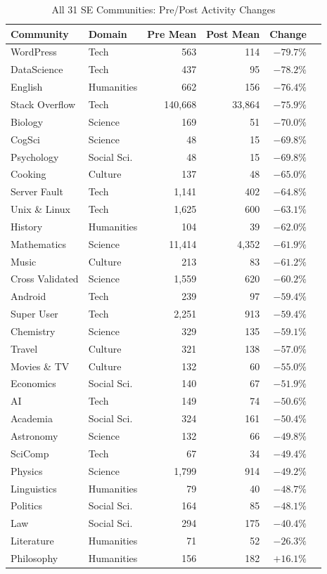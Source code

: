 \documentclass[11pt,a4paper]{article}
\begin{document}
\begin{table}[H]
\centering
\caption{All 31 SE Communities: Pre/Post Activity Changes}
\begin{tabular}{llrrrc}
\toprule
\textbf{Community} & \textbf{Domain} & \textbf{Pre Mean} & \textbf{Post Mean} & \textbf{Change} \\
\midrule
WordPress & Tech & 563 & 114 & $-79.7\%$ \\
DataScience & Tech & 437 & 95 & $-78.2\%$ \\
English & Humanities & 662 & 156 & $-76.4\%$ \\
Stack Overflow & Tech & 140,668 & 33,864 & $-75.9\%$ \\
Biology & Science & 169 & 51 & $-70.0\%$ \\
CogSci & Science & 48 & 15 & $-69.8\%$ \\
Psychology & Social Sci. & 48 & 15 & $-69.8\%$ \\
Cooking & Culture & 137 & 48 & $-65.0\%$ \\
Server Fault & Tech & 1,141 & 402 & $-64.8\%$ \\
Unix \& Linux & Tech & 1,625 & 600 & $-63.1\%$ \\
History & Humanities & 104 & 39 & $-62.0\%$ \\
Mathematics & Science & 11,414 & 4,352 & $-61.9\%$ \\
Music & Culture & 213 & 83 & $-61.2\%$ \\
Cross Validated & Science & 1,559 & 620 & $-60.2\%$ \\
Android & Tech & 239 & 97 & $-59.4\%$ \\
Super User & Tech & 2,251 & 913 & $-59.4\%$ \\
Chemistry & Science & 329 & 135 & $-59.1\%$ \\
Travel & Culture & 321 & 138 & $-57.0\%$ \\
Movies \& TV & Culture & 132 & 60 & $-55.0\%$ \\
Economics & Social Sci. & 140 & 67 & $-51.9\%$ \\
AI & Tech & 149 & 74 & $-50.6\%$ \\
Academia & Social Sci. & 324 & 161 & $-50.4\%$ \\
Astronomy & Science & 132 & 66 & $-49.8\%$ \\
SciComp & Tech & 67 & 34 & $-49.4\%$ \\
Physics & Science & 1,799 & 914 & $-49.2\%$ \\
Linguistics & Humanities & 79 & 40 & $-48.7\%$ \\
Politics & Social Sci. & 164 & 85 & $-48.1\%$ \\
Law & Social Sci. & 294 & 175 & $-40.4\%$ \\
Literature & Humanities & 71 & 52 & $-26.3\%$ \\
\rowcolor{green!10}
Philosophy & Humanities & 156 & 182 & $+16.1\%$ \\
\bottomrule
\end{tabular}
\end{table}
\end{document}
